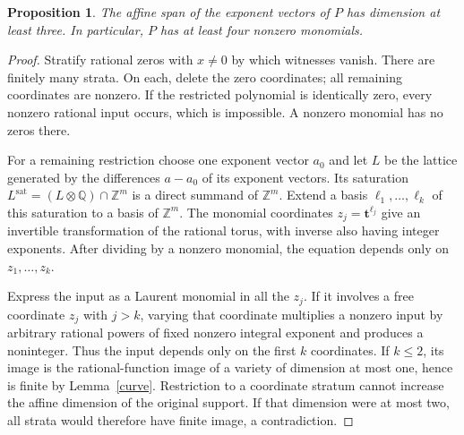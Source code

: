 \documentclass[11pt]{article}
\newtheorem{proposition}[theorem]{Proposition}
\theoremstyle{remark}\newtheorem{remark}[theorem]{Remark}
\newcommand{\Q}{\mathbb Q}\newcommand{\Z}{\mathbb Z}\newcommand{\R}{\mathbb R}
\begin{document}
\begin{proposition}\label{newton}
The affine span of the exponent vectors of \(P\) has dimension at least three. In particular, \(P\) has at least four nonzero monomials.
\end{proposition}
\begin{proof}
Stratify rational zeros with \(x\ne0\) by which witnesses vanish. There are finitely many strata. On each, delete the zero coordinates; all remaining coordinates are nonzero. If the restricted polynomial is identically zero, every nonzero rational input occurs, which is impossible. A nonzero monomial has no zeros there.

For a remaining restriction choose one exponent vector \(a_0\) and let \(L\) be the lattice generated by the differences \(a-a_0\) of its exponent vectors. Its saturation \(L^{\mathrm{sat}}=(L\otimes\Q)\cap\Z^m\) is a direct summand of \(\Z^m\). Extend a basis \(\ell_1,\ldots,\ell_k\) of this saturation to a basis of \(\Z^m\). The monomial coordinates \(z_j=\mathbf t^{\ell_j}\) give an invertible transformation of the rational torus, with inverse also having integer exponents. After dividing by a nonzero monomial, the equation depends only on \(z_1,\ldots,z_k\).

Express the input as a Laurent monomial in all the \(z_j\). If it involves a free coordinate \(z_j\) with \(j>k\), varying that coordinate multiplies a nonzero input by arbitrary rational powers of fixed nonzero integral exponent and produces a noninteger. Thus the input depends only on the first \(k\) coordinates. If \(k\le2\), its image is the rational-function image of a variety of dimension at most one, hence is finite by Lemma~\ref{curve}. Restriction to a coordinate stratum cannot increase the affine dimension of the original support. If that dimension were at most two, all strata would therefore have finite image, a contradiction.
\end{proof}
\end{document}
